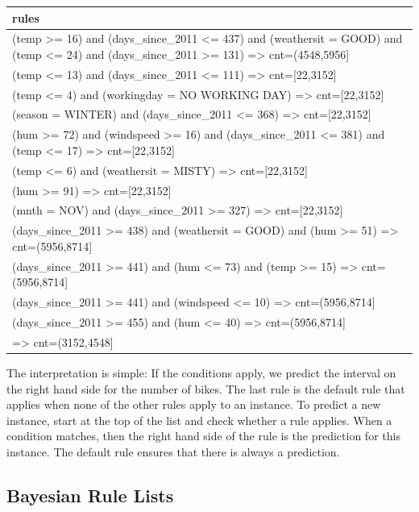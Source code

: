 \documentclass[
  10pt,
]{scrbook}
\begin{document}
\begin{table}
\centering
\begin{tabular}{>{\raggedright\arraybackslash}p{10cm}}
\toprule
rules\\
\midrule
(temp >= 16) and (days\_since\_2011 <= 437) and (weathersit = GOOD) and (temp <= 24) and (days\_since\_2011 >= 131) => cnt=(4548,5956]\\
(temp <= 13) and (days\_since\_2011 <= 111) => cnt=[22,3152]\\
(temp <= 4) and (workingday = NO WORKING DAY) => cnt=[22,3152]\\
(season = WINTER) and (days\_since\_2011 <= 368) => cnt=[22,3152]\\
(hum >= 72) and (windspeed >= 16) and (days\_since\_2011 <= 381) and (temp <= 17) => cnt=[22,3152]\\
\addlinespace
(temp <= 6) and (weathersit = MISTY) => cnt=[22,3152]\\
(hum >= 91) => cnt=[22,3152]\\
(mnth = NOV) and (days\_since\_2011 >= 327) => cnt=[22,3152]\\
(days\_since\_2011 >= 438) and (weathersit = GOOD) and (hum >= 51) => cnt=(5956,8714]\\
(days\_since\_2011 >= 441) and (hum <= 73) and (temp >= 15) => cnt=(5956,8714]\\
\addlinespace
(days\_since\_2011 >= 441) and (windspeed <= 10) => cnt=(5956,8714]\\
(days\_since\_2011 >= 455) and (hum <= 40) => cnt=(5956,8714]\\
=> cnt=(3152,4548]\\
\bottomrule
\end{tabular}
\end{table}

The interpretation is simple:
If the conditions apply, we predict the interval on the right hand side for the number of bikes.
The last rule is the default rule that applies when none of the other rules apply to an instance.
To predict a new instance, start at the top of the list and check whether a rule applies.
When a condition matches, then the right hand side of the rule is the prediction for this instance.
The default rule ensures that there is always a prediction.

\hypertarget{bayesian-rule-lists}{%
\subsection{Bayesian Rule Lists}\label{bayesian-rule-lists}}
\end{document}
